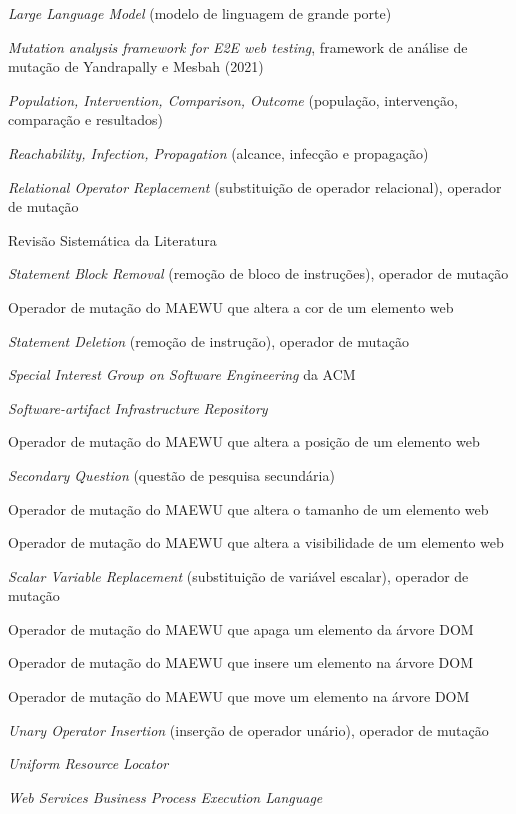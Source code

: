 \begin{siglas}
  \item[LLM] \textit{Large Language Model} (modelo de linguagem de grande porte)
  \item[MAEWU] \textit{Mutation analysis framework for E2E web testing}, framework de análise de mutação de Yandrapally e Mesbah (2021)
  \item[PICO] \textit{Population, Intervention, Comparison, Outcome} (população, intervenção, comparação e resultados)
  \item[RIP] \textit{Reachability, Infection, Propagation} (alcance, infecção e propagação)
  \item[ROR] \textit{Relational Operator Replacement} (substituição de operador relacional), operador de mutação
  \item[RSL] Revisão Sistemática da Literatura
  \item[SBR] \textit{Statement Block Removal} (remoção de bloco de instruções), operador de mutação
  \item[SCM] Operador de mutação do MAEWU que altera a cor de um elemento web
  \item[SDL] \textit{Statement Deletion} (remoção de instrução), operador de mutação
  \item[SIGSOFT] \textit{Special Interest Group on Software Engineering} da ACM
  \item[SIR] \textit{Software-artifact Infrastructure Repository}
  \item[SPM] Operador de mutação do MAEWU que altera a posição de um elemento web
  \item[SQ] \textit{Secondary Question} (questão de pesquisa secundária)
  \item[SSM] Operador de mutação do MAEWU que altera o tamanho de um elemento web
  \item[SVM] Operador de mutação do MAEWU que altera a visibilidade de um elemento web
  \item[SVR] \textit{Scalar Variable Replacement} (substituição de variável escalar), operador de mutação
  \item[TDM] Operador de mutação do MAEWU que apaga um elemento da árvore DOM
  \item[TIM] Operador de mutação do MAEWU que insere um elemento na árvore DOM
  \item[TMM] Operador de mutação do MAEWU que move um elemento na árvore DOM
  \item[UOI] \textit{Unary Operator Insertion} (inserção de operador unário), operador de mutação
  \item[URL] \textit{Uniform Resource Locator}
  \item[WS-BPEL] \textit{Web Services Business Process Execution Language}
\end{siglas}
